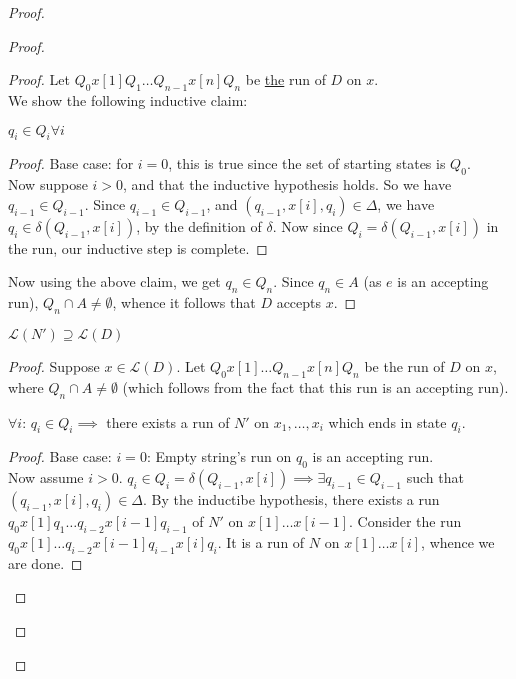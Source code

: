 \documentclass[a4paper]{article}
\newcommand{\mc}{\mathcal}
\begin{document}
\begin{proof}
\begin{proof}
\begin{proof}
            Let $Q_0 x[1] Q_1 \ldots Q_{n-1} x[n] Q_n$ be \underline{the} run of $D$ on $x$.\\

            We show the following inductive claim:
            \begin{claim}
                $q_i \in Q_i \forall i$
            \end{claim}

            \begin{proof}
                Base case: for $i = 0$, this is true since the set of starting states is $Q_0$.\\
                Now suppose $i > 0$, and that the inductive hypothesis holds. So we have $q_{i-1} \in Q_{i-1}$. Since $q_{i-1} \in Q_{i-1}$, and $(q_{i-1}, x[i], q_i) \in \Delta$, we have $q_i \in
                \delta(Q_{i-1}, x[i])$, by the definition of $\delta$. Now since $Q_i = \delta(Q_{i-1}, x[i])$ in the run, our inductive step is complete.
            \end{proof}

            Now using the above claim, we get $q_n \in Q_n$. Since $q_n \in A$ (as $e$ is an accepting run), $Q_n \cap A \ne \emptyset$, whence it follows that $D$ accepts $x$.
        \end{proof}


        \begin{claim}
            $\mc{L}(N') \supseteq \mc{L}(D)$
        \end{claim}



        \begin{proof}
            Suppose $x \in \mc{L}(D)$. Let $Q_0 x[1] \ldots Q_{n-1} x[n] Q_n$ be the run of $D$ on $x$, where $Q_n \cap A \ne \emptyset$ (which follows from the fact that this run is an
            accepting run).
            \begin{claim}
                $\forall i$: $q_i \in Q_i \implies$ there exists a run of $N'$ on $x_1, \ldots, x_i$ which ends in state $q_i$.
            \end{claim}

            \begin{proof}
                Base case: $i = 0$: Empty string's run on $q_0$ is an accepting run.\\
                Now assume $i > 0$. $q_i \in Q_i = \delta(Q_{i-1}, x[i]) \implies \exists q_{i-1} \in Q_{i-1}$ such that $(q_{i-1}, x[i], q_i) \in \Delta$. By the inductibe hypothesis, there
                exists a run $q_0 x[1] q_1 \ldots q_{i-2} x[i-1] q_{i-1}$ of $N'$ on $x[1] \ldots x[i-1]$. Consider the run $q_0 x[1] \ldots q_{i-2} x[i-1] q_{i-1} x[i] q_i$. It is a run of $N$ on $x[1]
                \ldots x[i]$, whence we are done.
            \end{proof}



\end{proof}
\end{proof}
\end{proof}
\end{document}
